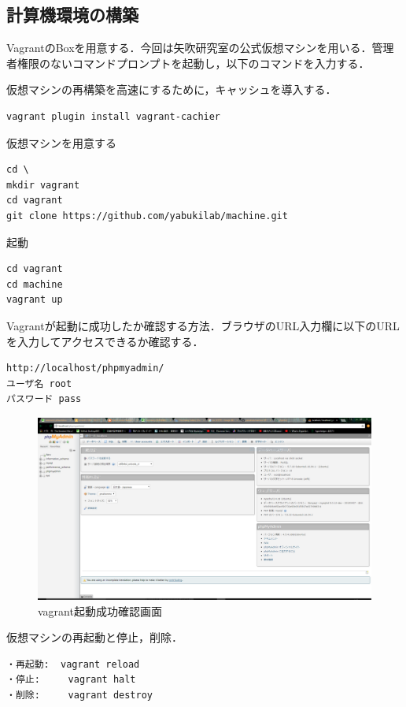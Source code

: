\newpage




\subsection{計算機環境の構築}
VagrantのBoxを用意する．今回は矢吹研究室の公式仮想マシンを用いる．管理者権限のないコマンドプロンプトを起動し，以下のコマンドを入力する．

仮想マシンの再構築を高速にするために，キャッシュを導入する．

\begin{verbatim}
vagrant plugin install vagrant-cachier
\end{verbatim}

仮想マシンを用意する
\begin{verbatim}
cd \
mkdir vagrant
cd vagrant
git clone https://github.com/yabukilab/machine.git
\end{verbatim}
\newpage

起動
\begin{verbatim}
cd vagrant
cd machine
vagrant up
\end{verbatim}

Vagrantが起動に成功したか確認する方法．ブラウザのURL入力欄に以下のURLを入力してアクセスできるか確認する．
\begin{verbatim}
http://localhost/phpmyadmin/
ユーザ名 root
パスワード pass
\end{verbatim}


\begin{figure}[h]
\centering
\includegraphics[width=12cm]{php.PNG}
\caption{vagrant起動成功確認画面}\label{サンプル図}
\end{figure}


仮想マシンの再起動と停止，削除．
\begin{verbatim}
・再起動:  vagrant reload
・停止:     vagrant halt
・削除:     vagrant destroy
\end{verbatim}


